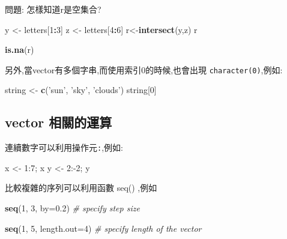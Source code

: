 \documentclass[]{book}
\newenvironment{Shaded}{\begin{snugshade}}{\end{snugshade}}
\newcommand{\KeywordTok}[1]{\textcolor[rgb]{0.13,0.29,0.53}{\textbf{#1}}}
\newcommand{\DataTypeTok}[1]{\textcolor[rgb]{0.13,0.29,0.53}{#1}}
\newcommand{\DecValTok}[1]{\textcolor[rgb]{0.00,0.00,0.81}{#1}}
\newcommand{\FloatTok}[1]{\textcolor[rgb]{0.00,0.00,0.81}{#1}}
\newcommand{\StringTok}[1]{\textcolor[rgb]{0.31,0.60,0.02}{#1}}
\newcommand{\CommentTok}[1]{\textcolor[rgb]{0.56,0.35,0.01}{\textit{#1}}}
\newcommand{\OperatorTok}[1]{\textcolor[rgb]{0.81,0.36,0.00}{\textbf{#1}}}
\newcommand{\NormalTok}[1]{#1}
\theoremstyle{definition}
\theoremstyle{definition}
\theoremstyle{definition}
\theoremstyle{remark}
\begin{document}
問題: 怎樣知道r是空集合?

\begin{Shaded}
\begin{Highlighting}[]
\NormalTok{y <-}\StringTok{ }\NormalTok{letters[}\DecValTok{1}\OperatorTok{:}\DecValTok{3}\NormalTok{] }
\NormalTok{z <-}\StringTok{ }\NormalTok{letters[}\DecValTok{4}\OperatorTok{:}\DecValTok{6}\NormalTok{] }
\NormalTok{r<-}\KeywordTok{intersect}\NormalTok{(y,z) }
\NormalTok{r}
\end{Highlighting}
\end{Shaded}

\begin{Shaded}
\begin{Highlighting}[]
\KeywordTok{is.na}\NormalTok{(r)}
\end{Highlighting}
\end{Shaded}

另外,當vector有多個字串,而使用索引0的時候,也會出現
\texttt{character(0)},例如:

\begin{Shaded}
\begin{Highlighting}[]
\NormalTok{string <-}\StringTok{ }\KeywordTok{c}\NormalTok{(}\StringTok{'sun'}\NormalTok{, }\StringTok{'sky'}\NormalTok{, }\StringTok{'clouds'}\NormalTok{)}
\NormalTok{string[}\DecValTok{0}\NormalTok{]}
\end{Highlighting}
\end{Shaded}

\subsection{vector 相關的運算}\label{vector-}

連續數字可以利用操作元\texttt{:},例如:

x \textless{}- 1:7; x y \textless{}- 2:-2; y

比較複雜的序列可以利用函數 seq() ,例如

\begin{Shaded}
\begin{Highlighting}[]
\KeywordTok{seq}\NormalTok{(}\DecValTok{1}\NormalTok{, }\DecValTok{3}\NormalTok{, }\DataTypeTok{by=}\FloatTok{0.2}\NormalTok{)          }\CommentTok{# specify step size}
\end{Highlighting}
\end{Shaded}

\begin{Shaded}
\begin{Highlighting}[]
 \KeywordTok{seq}\NormalTok{(}\DecValTok{1}\NormalTok{, }\DecValTok{5}\NormalTok{, }\DataTypeTok{length.out=}\DecValTok{4}\NormalTok{)    }\CommentTok{# specify length of the vector}
\end{Highlighting}
\end{Shaded}
\end{document}
